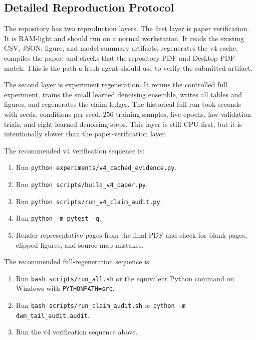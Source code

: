 \documentclass{article}
\begin{document}
\subsection{Detailed Reproduction Protocol}
\label{app:v4-reproduction-protocol}

The repository has two reproduction layers. The first layer is paper
verification. It is RAM-light and should run on a normal workstation. It reads
the existing CSV, JSON, figure, and model-summary artifacts; regenerates the
v4 cache; compiles the paper; and checks that the repository PDF and Desktop
PDF match. This is the path a fresh agent should use to verify the submitted
artifact.

The second layer is experiment regeneration. It reruns the controlled full
experiment, trains the small learned denoising ensemble, writes all tables and
figures, and regenerates the claim ledger. The historical full run took
\VFourDWMRunSeconds{} seconds with \VFourDWMRunSeeds{} seeds,
\VFourDWMRunConditions{} conditions per seed, $256$ training samples, five
epochs, \VFourDWMLawTrials{} law-validation trials, and eight learned
denoising steps. This layer is still CPU-first, but it is intentionally slower
than the paper-verification layer.

The recommended v4 verification sequence is:
\begin{enumerate}
\item Run \texttt{python experiments/v4\_cached\_evidence.py}.
\item Run \texttt{python scripts/build\_v4\_paper.py}.
\item Run \texttt{python scripts/run\_v4\_claim\_audit.py}.
\item Run \texttt{python -m pytest -q}.
\item Render representative pages from the final PDF and check for blank
pages, clipped figures, and source-map mistakes.
\end{enumerate}

The recommended full-regeneration sequence is:
\begin{enumerate}
\item Run \texttt{bash scripts/run\_all.sh} or the equivalent Python command
on Windows with \texttt{PYTHONPATH=src}.
\item Run \texttt{bash scripts/run\_claim\_audit.sh} or
\texttt{python -m dwm\_tail\_audit.audit}.
\item Run the v4 verification sequence above.
\end{enumerate}
\end{document}
